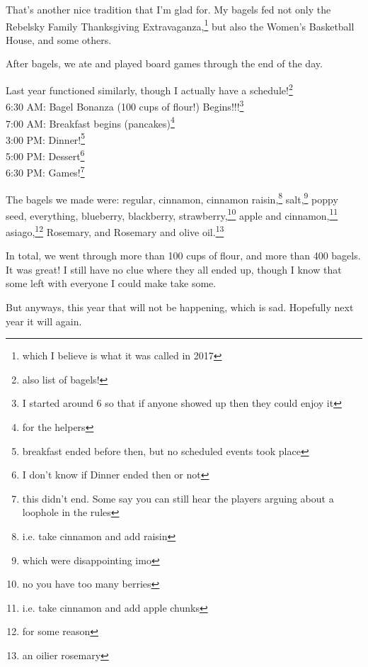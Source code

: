 \documentclass[12pt]{article}[titlepage]
\newcommand{\1}{\={a}}
\newcommand{\2}{\={e}}
\newcommand{\3}{\={\i}}
\newcommand{\4}{\=o}
\newcommand{\5}{\=u}
\newcommand{\6}{\={A}}
\renewcommand{\,}{\textsuperscript{,}}
\begin{document}
That's another nice tradition that I'm glad for.
My bagels fed not only the Rebelsky Family Thanksgiving Extravaganza,\footnote{which I believe is what it was called in 2017} but also the Women's Basketball House, and some others.

After bagels, we ate and played board games through the end of the day.

Last year functioned similarly, though I actually have a schedule!\footnote{also list of bagels!}\\
6:30 AM: Bagel Bonanza (100 cups of flour!) Begins!!!\footnote{I started around 6 so that if anyone showed up then they could enjoy it}\\
7:00 AM: Breakfast begins (pancakes)\footnote{for the helpers}\\
3:00 PM: Dinner!\footnote{breakfast ended before then, but no scheduled events took place}\\
5:00 PM: Dessert\footnote{I don't know if Dinner ended then or not}\\
6:30 PM: Games!\footnote{this didn't end. Some say you can still hear the players arguing about a loophole in the rules}

The bagels we made were:
	regular,
	cinnamon,
	cinnamon raisin,\footnote{i.e. take cinnamon and add raisin}
	salt,\footnote{which were disappointing imo}
	poppy seed,
	everything,
	blueberry,
	blackberry,
	strawberry,\footnote{no you have too many berries}
	apple and cinnamon,\footnote{i.e. take cinnamon and add apple chunks}
	asiago,\footnote{for some reason}
	Rosemary, and
	Rosemary and olive oil.\footnote{an oilier rosemary}

In total, we went through more than 100 cups of flour, and more than 400 bagels.
It was great!
I still have no clue where they all ended up, though I know that some left with everyone I could make take some.

But anyways, this year that will not be happening, which is sad.
Hopefully next year it will again. 
\end{document}
